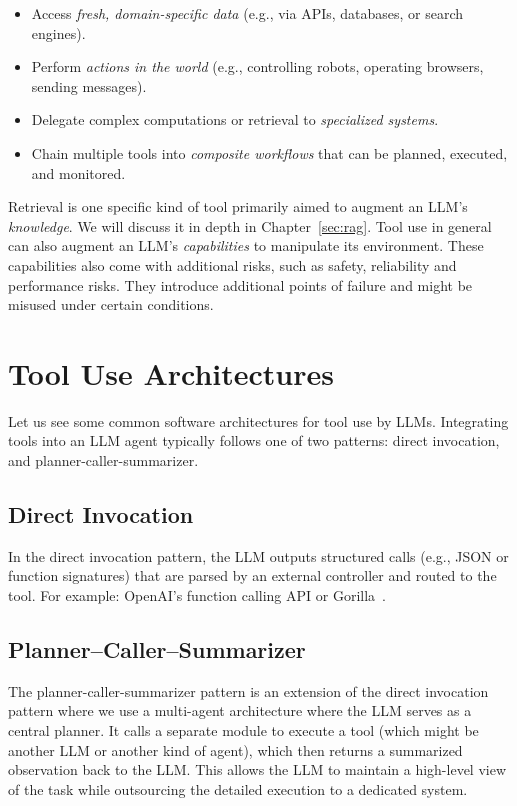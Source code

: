 \begin{itemize}
    \item Access \textit{fresh, domain-specific data} (e.g., via APIs, databases, or search engines).
    \item Perform \textit{actions in the world} (e.g., controlling robots, operating browsers, sending messages).
    \item Delegate complex computations or retrieval to \textit{specialized systems}.
    \item Chain multiple tools into \textit{composite workflows} that can be planned, executed, and monitored.
\end{itemize}
%
Retrieval  is one specific kind of tool primarily aimed to  augment an LLM's \emph{knowledge}. We will discuss it in depth  in Chapter~\ref{sec:rag}. Tool use in general can also augment an LLM's \emph{capabilities} to manipulate its environment. These capabilities also come with additional risks, such as safety, reliability and performance risks. They introduce additional points of failure and might be misused under certain conditions.




\section{Tool Use Architectures}
Let us see some common software architectures for tool use by LLMs. 
Integrating tools into an LLM agent typically follows one of two patterns: direct invocation, and planner-caller-summarizer.

\subsection*{Direct Invocation}
In the direct invocation pattern, the LLM outputs structured calls (e.g., JSON or function signatures) that are parsed by an external controller and routed to the tool. For example: OpenAI's function calling API or Gorilla~\citep{patil2023gorillalargelanguagemodel}.

\subsection*{Planner–Caller–Summarizer}
The planner-caller-summarizer pattern is an extension of the direct invocation pattern where we use a multi-agent architecture where the LLM serves as a central planner. It calls a separate module to execute a tool (which might be another LLM or another kind of agent), which then returns a summarized observation back to the LLM. This allows the LLM to maintain a high-level view of the task while outsourcing the detailed execution to a dedicated system.

